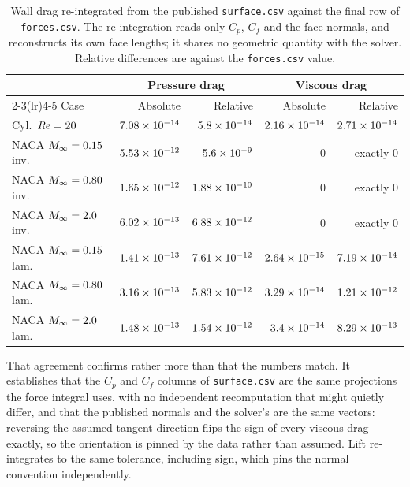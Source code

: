 \begin{table}[htbp]
  \centering
  \caption{Wall drag re-integrated from the published \texttt{surface.csv} against the
  final row of \texttt{forces.csv}. The re-integration reads only $C_p$, $C_f$ and the
  face normals, and reconstructs its own face lengths; it shares no geometric quantity
  with the solver. Relative differences are against the \texttt{forces.csv} value.}
  \label{tab:reintegrate}
  \footnotesize
  \begin{tabular}{lrrrr}
    \toprule
    & \multicolumn{2}{c}{Pressure drag} & \multicolumn{2}{c}{Viscous drag} \\
    \cmidrule(lr){2-3}\cmidrule(lr){4-5}
    Case & Absolute & Relative & Absolute & Relative \\
    \midrule
    Cyl.\ $\mathit{Re}=20$ & $\num{7.08e-14}$ & $\num{5.8e-14}$
      & $\num{2.16e-14}$ & $\num{2.71e-14}$ \\
    NACA $M_\infty=0.15$ inv. & $\num{5.53e-12}$ & $\num{5.6e-09}$
      & $0$ & exactly $0$ \\
    NACA $M_\infty=0.80$ inv. & $\num{1.65e-12}$ & $\num{1.88e-10}$
      & $0$ & exactly $0$ \\
    NACA $M_\infty=2.0$ inv. & $\num{6.02e-13}$ & $\num{6.88e-12}$
      & $0$ & exactly $0$ \\
    NACA $M_\infty=0.15$ lam. & $\num{1.41e-13}$ & $\num{7.61e-12}$
      & $\num{2.64e-15}$ & $\num{7.19e-14}$ \\
    NACA $M_\infty=0.80$ lam. & $\num{3.16e-13}$ & $\num{5.83e-12}$
      & $\num{3.29e-14}$ & $\num{1.21e-12}$ \\
    NACA $M_\infty=2.0$ lam. & $\num{1.48e-13}$ & $\num{1.54e-12}$
      & $\num{3.4e-14}$ & $\num{8.29e-13}$ \\
    \bottomrule
  \end{tabular}
\end{table}

That agreement confirms rather more than that the numbers match. It establishes that the
$C_p$ and $C_f$ columns of \texttt{surface.csv} are the same projections the force
integral uses, with no independent recomputation that might quietly differ, and that the
published normals and the solver's are the same vectors: reversing the assumed tangent
direction flips the sign of every viscous drag exactly, so the orientation is pinned by
the data rather than assumed. Lift re-integrates to the same tolerance, including sign,
which pins the normal convention independently.


